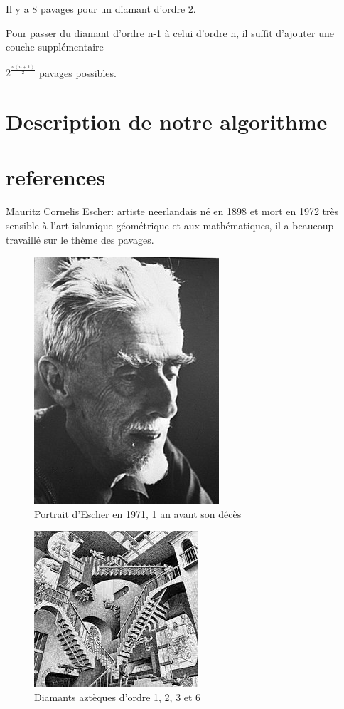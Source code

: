 \documentclass{article}
\begin{document}
Il y a 8 pavages pour un diamant d'ordre 2.

Pour passer du diamant d'ordre n-1 à celui d'ordre n, il suffit d'ajouter une couche supplémentaire

$2^{\frac{n\left ( n+1 \right )}{2}}$ pavages possibles.

\clearpage

\section{Description de notre algorithme}

\clearpage

\section{references}


Mauritz Cornelis Escher: artiste neerlandais né en 1898 et mort en 1972 très sensible à l’art islamique géométrique et aux mathématiques, il a beaucoup travaillé sur le thème des pavages.

\begin{figure} [!h]
    \center
    \includegraphics [scale=0.5] {image/escher.jpg}
    \caption{Portrait d'Escher en 1971, 1 an avant son décès}
\end{figure}

\begin{figure} [!h]
    \center
    \includegraphics [scale=0.5] {image/dessin1_escherjpg.jpg}
    \caption{Diamants aztèques d'ordre 1, 2, 3 et 6}
\end{figure}
\end{document}
